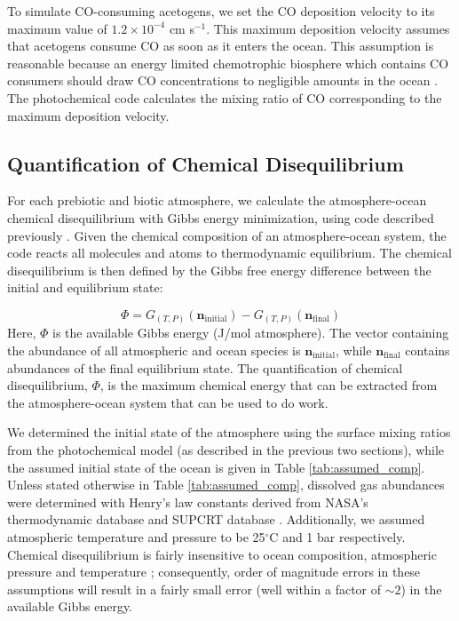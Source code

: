 To simulate CO-consuming acetogens, we set the CO deposition velocity to its maximum value of $1.2 \times 10^{-4}$ cm s$^{-1}$. This maximum deposition velocity assumes that acetogens consume CO as soon as it enters the ocean. This assumption is reasonable because an energy limited chemotrophic biosphere which contains CO consumers should draw CO concentrations to negligible amounts in the ocean \citep{Kharecha_2005,Schwieterman_2019}. The photochemical code calculates the mixing ratio of CO corresponding to the maximum deposition velocity.

\subsection{Quantification of Chemical Disequilibrium}

For each prebiotic and biotic atmosphere, we calculate the atmosphere-ocean chemical disequilibrium with Gibbs energy minimization, using code described previously \citep{KrissansenTotton_2018_diseq}. Given the chemical composition of an atmosphere-ocean system, the code reacts all molecules and atoms to thermodynamic equilibrium. The chemical disequilibrium is then defined by the Gibbs free energy difference between the initial and equilibrium state:

\begin{equation}
  \Phi = G_{(T,P)} \left( \textbf{n}_\mathrm{initial} \right) - G_{(T,P)} \left( \textbf{n}_\mathrm{final} \right)
\end{equation}
Here, $\Phi$ is the available Gibbs energy (J/mol atmosphere). The vector containing the abundance of all atmospheric and ocean species is $\textbf{n}_\mathrm{initial}$, while $\textbf{n}_\mathrm{final}$ contains abundances of the final equilibrium state. The quantification of chemical disequilibrium, $\Phi$, is the maximum chemical energy that can be extracted from the atmosphere-ocean system that can be used to do work.

We determined the initial state of the atmosphere using the surface mixing ratios from the photochemical model (as described in the previous two sections), while the assumed initial state of the ocean is given in Table \ref{tab:assumed_comp}. Unless stated otherwise in Table \ref{tab:assumed_comp}, dissolved gas abundances were determined with Henry's law constants derived from NASA's thermodynamic database \citep{Burcat_2005} and SUPCRT database \citep{Johnson_1992}. Additionally, we assumed atmospheric temperature and pressure to be 25$^\circ$C and 1 bar respectively. Chemical disequilibrium is fairly insensitive to ocean composition, atmospheric pressure and temperature \citep{KrissansenTotton_2018_diseq}; consequently, order of magnitude errors in these assumptions will result in a fairly small error (well within a factor of $\sim 2$) in the available Gibbs energy.

